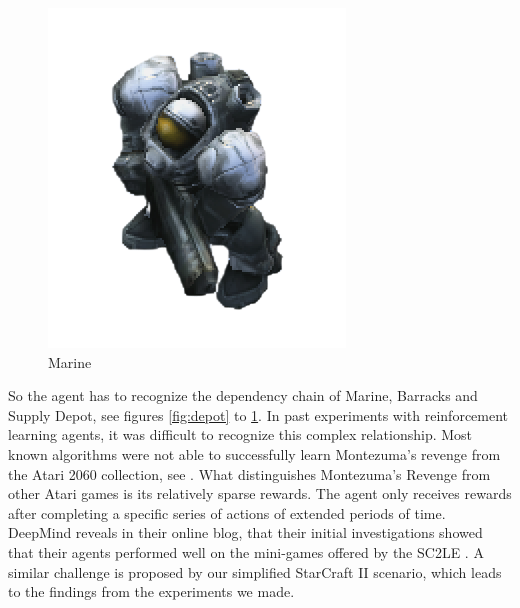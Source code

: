 \documentclass[12pt,a4paper]{article}
\begin{document}
\begin{figure}
    \endminipage\hfill
    \includegraphics[width=\linewidth]{Figures/marine.png}
    \caption{Marine}\label{fig:marine}
    \endminipage
\end{figure}
So the agent has to recognize the dependency chain of Marine, Barracks and Supply Depot, see figures \ref{fig:depot} to \ref{fig:marine}. In past experiments with reinforcement learning agents, it was difficult to recognize this complex relationship. Most known algorithms were not able to successfully learn Montezuma's revenge from the Atari 2060 collection, see \cite{DBLP:journals/corr/abs-1805-11592}. What distinguishes Montezuma's Revenge from other Atari games is its relatively sparse rewards. The agent only receives rewards after completing a specific series of actions of extended periods of time. DeepMind reveals in their online blog, that their initial investigations showed that their agents performed well on the mini-games offered by the SC2LE \cite{DeepMindBlog2017}.
A similar challenge is proposed by our simplified StarCraft II scenario, which leads to the findings from the experiments we made.
\end{document}
